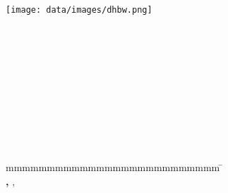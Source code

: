 
\begin{titlepage}
	\begin{center}
	    \texttt{[image: data/images/dhbw.png]}	    
	\end{center}

	\enlargethispage{15mm}
	\begin{center}
		\vspace*{10mm}	{\LARGE\textbf \titel }\\
		\vspace*{10mm}	{\large\textbf \arbeit}\\
		\vspace*{10mm}	\langdeckblattabschlusshinleitung\\
		\vspace*{3mm}		{\textbf \abschluss}\\
		\vspace*{10mm}	\langartikelstudiengang{} \langstudiengang{} \studiengang\\
		\vspace*{3mm}		\langanderdh{} \dhbw\\
		\vspace*{10mm}	\langvon\\
		\vspace*{3mm}		{\large\textbf \autor}\\
		\vspace*{10mm}	\datumAbgabe\\
		\vspace*{10mm}
	\end{center}
	\vfill
	\begin{spacing}{1.2}
		\begin{tabbing}
			mmmmmmmmmmmmmmmmmmmmmmmmmm             \= \kill
			\textbf{\langdbbearbeitungszeit}       \>  \zeitraum\\
			\textbf{\langdbmatriknr, \langdbkurs}  \>  \martrikelnr, \kurs\\
			\textbf{\langdbbetreuer}               \>  \betreuer\\
		\end{tabbing}
	\end{spacing}
\end{titlepage}
